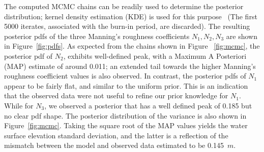 The computed MCMC chains can be readily used to determine the posterior 
distribution; kernel density estimation (KDE) is used for this purpose
~\citep{Parzen1962,Silverman1986}(The first 5000 iterates, associated 
with the burn-in period, are discarded). The resulting posterior pdfs 
of the three Manning's roughness coefficients $N_1,N_2,N_3$ are shown 
in Figure~\ref{fig:pdfs}.  As expected from the chains shown in Figure
~\ref{fig:mcmc}, the posterior pdf of $N_2$, exhibits well-defined peak, 
with a Maximum A Posteriori (MAP) estimate of around 0.011; an extended tail 
towards the higher Manning's roughness coefficient values is also observed.
In contrast, the posterior pdfs of $N_1$ appear to be fairly flat, 
and similar to the uniform prior. This is an indication that 
the observed data were not useful to refine our prior knowledge for $N_1$.
While for $N_3$, we observed a posterior that has a well defined peak
of 0.185 but no clear pdf shape.
The posterior distribution of the variance is also shown in Figure~\ref{fig:mcmc}. 
Taking the square root of the MAP values yields the water surface elevation standard 
deviation, and the latter is a reflection of the mismatch between the model and 
observed data estimated to be 0.145~$m$.





